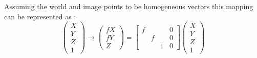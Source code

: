     Assuming the world and image points to be homogeneous vectors this mapping can be represented as \cite{10.5555/861369}:
  \begin{equation}
\left(\begin{array}{c}X \\ Y \\ Z \\ 1 \end{array}\right) \rightarrow \left(\begin{array}{c} fX \\ fY \\ Z \end{array}\right) = \begin{bmatrix}f & & & 0 \\  &f & & 0  \\   & &1 & 0   \end{bmatrix}\left(\begin{array}{c}X\\ Y  \\Z \\ 1 \end{array}\right)
\end{equation}

